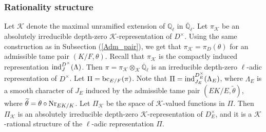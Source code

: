 \documentclass[10pt, reqno]{amsart}
\theoremstyle{plain}
\numberwithin{equation}{section}
\begin{document}
\subsubsection{Rationality structure}
Let $\mathcal{K}$ denote the maximal unramified extension of $\mathbb{Q}_\ell$ in $\overline{\mathbb{Q}}_\ell$. Let $\pi_{\mathcal{K}}$ be an absolutely irreducible depth-zero $\mathcal{K}$-representation of $D^\times$. Using the same construction as in Subsection (\ref{Adm_pair}), we get that $\pi_{\mathcal{K}}=\pi_D(\theta)$ for an admissible tame pair $(K/F,\theta)$. Recall that $\pi_{\mathcal{K}}$ is the compactly induced representation ${\rm ind}_{J}^{D^\times}(\Lambda)$. Then $\pi=\pi_{\mathcal{K}}\otimes_{\mathcal{K}}
\overline{\mathbb{Q}}_\ell$ is an irreducible depth-zero $\ell$-adic representation of $D^\times$. Let $\Pi = {\rm bc}_{E/F}(\pi)$. Note that $\Pi = {\rm ind}_{J_E}^{D_E^\times}(\Lambda_E)$, where $\Lambda_E$ is a smooth character of $J_E$ induced by the admissible tame pair $(EK/E,\widetilde{\theta})$, where $\widetilde{\theta}=\theta\circ {\rm Nr}_{EK/K}$. Let $\Pi_{\mathcal{K}}$ be the space of $\mathcal{K}$-valued functions in $\Pi$. Then $\Pi_{\mathcal{K}}$ is an absolutely irreducible depth-zero $\mathcal{K}$-representation of $D_E^\times$, and it is a $\mathcal{K}$-rational structure of the $\ell$-adic representation $\Pi$.
\end{document}
